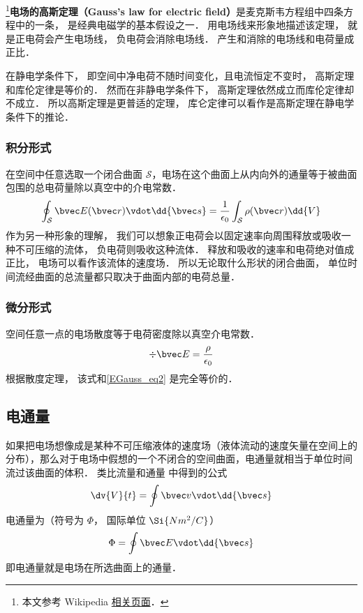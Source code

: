 

\footnote{本文参考 Wikipedia \href{https://en.wikipedia.org/wiki/Gauss's_law}{相关页面}．}\textbf{电场的高斯定理（Gauss's law for electric field）}是麦克斯韦方程组中四条方程中的一条， 是经典电磁学的基本假设之一． 用电场线来形象地描述该定理， 就是正电荷会产生电场线， 负电荷会消除电场线． 产生和消除的电场线和电荷量成正比．

在静电学条件下， 即空间中净电荷不随时间变化，且电流恒定不变时， 高斯定理和库伦定律是等价的． 然而在非静电学条件下， 高斯定理依然成立而库伦定律却不成立． 所以高斯定理是更普适的定理， 库仑定律可以看作是高斯定理在静电学条件下的推论．

\subsubsection{积分形式}
在空间中任意选取一个闭合曲面 $\mathcal S$，电场在这个曲面上从内向外的通量等于被曲面包围的总电荷量除以真空中的介电常数．
\begin{equation}\label{EGauss_eq2}
\oint_{\mathcal S} \bvec E(\bvec r) \vdot \dd{\bvec s} = \frac{1}{\epsilon_0} \int_{\mathcal S} \rho(\bvec r) \dd{V}
\end{equation}
作为另一种形象的理解， 我们可以想象正电荷会以固定速率向周围释放或吸收一种不可压缩的流体， 负电荷则吸收这种流体． 释放和吸收的速率和电荷绝对值成正比， 电场可以看作该流体的速度场． 所以无论取什么形状的闭合曲面， 单位时间流经曲面的总流量都只取决于曲面内部的电荷总量．

\subsubsection{微分形式}
空间任意一点的电场散度等于电荷密度除以真空介电常数．
\begin{equation}\label{EGauss_eq1}
\div \bvec E = \frac{\rho}{\epsilon_0}
\end{equation}
根据散度定理， 该式和\autoref{EGauss_eq2} 是完全等价的．

\subsection{电通量}
如果把电场想像成是某种不可压缩液体的速度场（液体流动的速度矢量在空间上的分布），那么对于电场中假想的一个不闭合的空间曲面，电通量就相当于单位时间流过该曲面的体积．
类比流量和通量%
中得到的公式
\begin{equation}
\dv{V}{t} = \oint \bvec v \vdot \dd{\bvec s}
\end{equation} 
电通量为（符号为 $\Phi $， 国际单位 $\Si{N m^2/C}$）
\begin{equation}
\Phi  = \oint \bvec E \vdot \dd{\bvec s}
\end{equation} 
即电通量就是电场在所选曲面上的通量．


